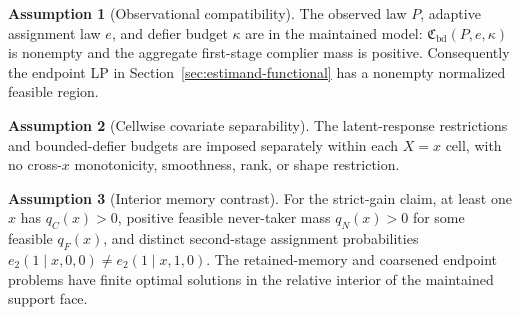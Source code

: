 \documentclass[11pt]{article}
\theoremstyle{definition}
\newtheorem{assumption}{Assumption}
\theoremstyle{plain}
\theoremstyle{remark}
\begin{document}
\begin{assumption}[Observational compatibility]\label{ass:compatible}
The observed law \(P\), adaptive assignment law \(e\), and defier budget \(\kappa\) are in the maintained model: \(\mathfrak C_{\mathrm{bd}}(P,e,\kappa)\) is nonempty and the aggregate first-stage complier mass is positive.  Consequently the endpoint LP in Section~\ref{sec:estimand-functional} has a nonempty normalized feasible region.
\end{assumption}

\begin{assumption}[Cellwise covariate separability]\label{ass:cellwise}
The latent-response restrictions and bounded-defier budgets are imposed separately within each \(X=x\) cell, with no cross-\(x\) monotonicity, smoothness, rank, or shape restriction.
\end{assumption}

\begin{assumption}[Interior memory contrast]\label{ass:interior-memory}
For the strict-gain claim, at least one \(x\) has \(q_C(x)>0\), positive feasible never-taker mass \(q_N(x)>0\) for some feasible \(q_F(x)\), and distinct second-stage assignment probabilities \(e_2(1\mid x,0,0)\ne e_2(1\mid x,1,0)\).  The retained-memory and coarsened endpoint problems have finite optimal solutions in the relative interior of the maintained support face.
\end{assumption}
\end{document}
